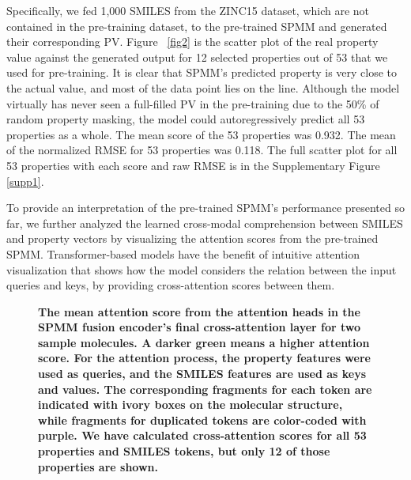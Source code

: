 \documentclass{nature_meth}
\newcommand{\1}{\blmath{1}}
\newcommand{\0}{\blmath{0}}
\begin{document}
Specifically, we fed 1,000 SMILES from the ZINC15 dataset\cite{zinc15}, which are not contained in the pre-training dataset, to the pre-trained SPMM and generated their corresponding PV. Figure ~\ref{fig2} is the scatter plot of the real property value against the generated output for 12 selected properties out of 53 that we used for pre-training. It is clear that SPMM's predicted property is very close to the actual value, and most of the data point lies on the  line. Although the model virtually has never seen a full-filled PV in the pre-training due to the 50\% of random property masking, the model could autoregressively predict all 53 properties as a whole. The mean  score of the 53 properties was 0.932. The mean of the normalized RMSE for 53 properties was 0.118. The full scatter plot for all 53 properties with each  score and raw RMSE is in the Supplementary Figure \ref{supp1}.

To provide an interpretation of the pre-trained SPMM's performance presented so far, we further analyzed the learned cross-modal comprehension between SMILES and property vectors by visualizing the attention scores from the pre-trained SPMM. Transformer-based models have the benefit of intuitive attention visualization that shows how the model considers the relation between the input queries and keys, by providing cross-attention scores between them. 

\begin{figure}[!hbt]
	\centering
 \centerline{}
	\caption{\bf\footnotesize 
The mean attention score from the attention heads in the SPMM fusion encoder's final cross-attention layer for two sample molecules. A darker green means a higher attention score. For the attention process, the property features were used as queries, and the SMILES features are used as keys and values. The corresponding fragments for each token are indicated with ivory boxes on the molecular structure, while fragments for duplicated tokens are color-coded with purple. We have calculated cross-attention scores for all 53 properties and SMILES tokens, but only 12 of those properties are shown.
}
	\label{av}
\end{figure}
\end{document}
